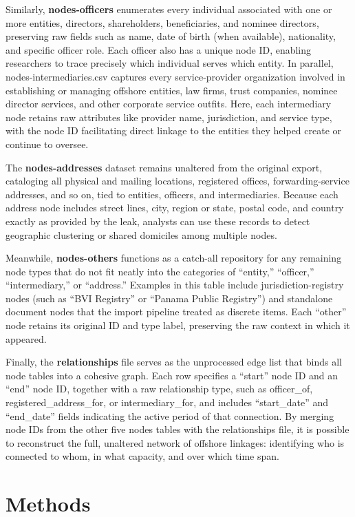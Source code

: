 \documentclass{article}
\begin{document}
Similarly, \textbf{nodes-officers} enumerates every individual associated with one or more entities, directors, shareholders, beneficiaries, and nominee directors, preserving raw fields such as name, date of birth (when available), nationality, and specific officer role. Each officer also has a unique node ID, enabling researchers to trace precisely which individual serves which entity. In parallel, nodes-intermediaries.csv captures every service-provider organization involved in establishing or managing offshore entities, law firms, trust companies, nominee director services, and other corporate service outfits. Here, each intermediary node retains raw attributes like provider name, jurisdiction, and service type, with the node ID facilitating direct linkage to the entities they helped create or continue to oversee.

The \textbf{nodes-addresses} dataset remains unaltered from the original export, cataloging all physical and mailing locations, registered offices, forwarding-service addresses, and so on, tied to entities, officers, and intermediaries. Because each address node includes street lines, city, region or state, postal code, and country exactly as provided by the leak, analysts can use these records to detect geographic clustering or shared domiciles among multiple nodes. 

Meanwhile, \textbf{nodes-others} functions as a catch-all repository for any remaining node types that do not fit neatly into the categories of “entity,” “officer,” “intermediary,” or “address.” Examples in this table include jurisdiction-registry nodes (such as “BVI Registry” or “Panama Public Registry”) and standalone document nodes that the import pipeline treated as discrete items. Each “other” node retains its original ID and type label, preserving the raw context in which it appeared.

Finally, the \textbf{relationships} file serves as the unprocessed edge list that binds all node tables into a cohesive graph. Each row specifies a “start” node ID and an “end” node ID, together with a raw relationship type, such as officer\_of, registered\_address\_for, or intermediary\_for, and includes “start\_date” and “end\_date” fields indicating the active period of that connection. By merging node IDs from the other five nodes tables with the relationships file, it is possible to reconstruct the full, unaltered network of offshore linkages: identifying who is connected to whom, in what capacity, and over which time span.

\section{Methods}
\end{document}

